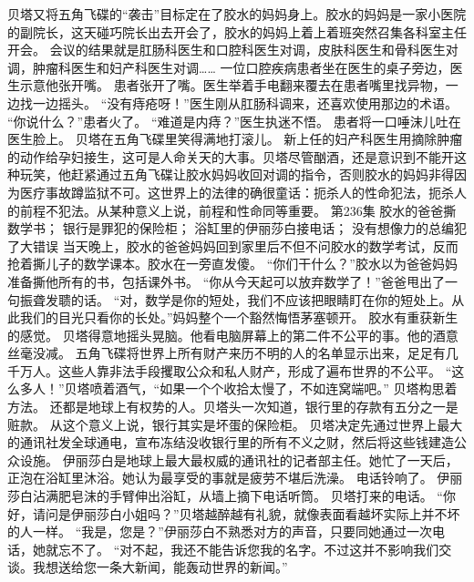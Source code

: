 \documentclass[a4paper,12pt,UTF8,twoside]{ctexbook}
\begin{document}
        贝塔又将五角飞碟的“袭击”目标定在了胶水的妈妈身上。胶水的妈妈是一家小医院的副院长，这天碰巧院长出去开会了，胶水的妈妈上着上着班突然召集各科室主任开会。  
        会议的结果就是肛肠科医生和口腔科医生对调，皮肤科医生和骨科医生对调，肿瘤科医生和妇产科医生对调……  
        一位口腔疾病患者坐在医生的桌子旁边，医生示意他张开嘴。  
        患者张开了嘴。医生举着手电翻来覆去在患者嘴里找异物，一边找一边摇头。  
        “没有痔疮呀！”医生刚从肛肠科调来，还喜欢使用那边的术语。  
        “你说什么？”患者火了。  
        “难道是内痔？”医生执迷不悟。  
        患者将一口唾沫儿吐在医生脸上。  
        贝塔在五角飞碟里笑得满地打滚儿。  
        新上任的妇产科医生用摘除肿瘤的动作给孕妇接生，这可是人命关天的大事。贝塔尽管酗酒，还是意识到不能开这种玩笑，他赶紧通过五角飞碟让胶水妈妈收回对调的指令，否则胶水的妈妈非得因为医疗事故蹲监狱不可。这世界上的法律的确很童话：扼杀人的性命犯法，扼杀人的前程不犯法。从某种意义上说，前程和性命同等重要。          第236集  
        胶水的爸爸撕数学书；  
        银行是罪犯的保险柜；  
        浴缸里的伊丽莎白接电话；  
        没有想像力的总编犯了大错误    
        当天晚上，胶水的爸爸妈妈回到家里后不但不问胶水的数学考试，反而抢着撕儿子的数学课本。胶水在一旁直发傻。  
        “你们干什么？”胶水以为爸爸妈妈准备撕他所有的书，包括课外书。  
        “你从今天起可以放弃数学了！”爸爸甩出了一句振聋发聩的话。  
        “对，数学是你的短处，我们不应该把眼睛盯在你的短处上。从此我们的目光只看你的长处。”妈妈整个一个豁然悔悟茅塞顿开。  
        胶水有重获新生的感觉。        
        贝塔得意地摇头晃脑。他看电脑屏幕上的第二件不公平的事。他的酒意丝毫没减。  
        五角飞碟将世界上所有财产来历不明的人的名单显示出来，足足有几千万人。这些人靠非法手段攫取公众和私人财产，形成了遍布世界的不公平。  
        “这么多人！”贝塔喷着酒气，“如果一个个收拾太慢了，不如连窝端吧。”  
        贝塔构思着方法。  
        还都是地球上有权势的人。贝塔头一次知道，银行里的存款有五分之一是赃款。  
        从这个意义上说，银行其实是坏蛋的保险柜。  
        贝塔决定先通过世界上最大的通讯社发全球通电，宣布冻结没收银行里的所有不义之财，然后将这些钱建造公众设施。  
        伊丽莎白是地球上最大最权威的通讯社的记者部主任。她忙了一天后，正泡在浴缸里沐浴。她认为最享受的事就是疲劳不堪后洗澡。  
        电话铃响了。  
        伊丽莎白沾满肥皂沫的手臂伸出浴缸，从墙上摘下电话听筒。  
        贝塔打来的电话。  
        “你好，请问是伊丽莎白小姐吗？”贝塔越醉越有礼貌，就像表面看越坏实际上并不坏的人一样。  
        “我是，您是？”伊丽莎白不熟悉对方的声音，只要同她通过一次电话，她就忘不了。  
        “对不起，我还不能告诉您我的名字。不过这并不影响我们交谈。我想送给您一条大新闻，能轰动世界的新闻。”  
\end{document}

